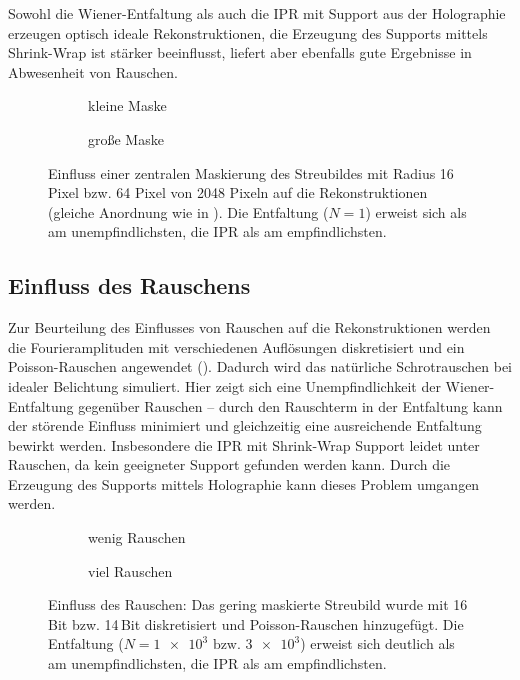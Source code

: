 Sowohl die Wiener-Entfaltung als auch die IPR mit Support aus der Holographie erzeugen optisch ideale Rekonstruktionen, die Erzeugung des Supports mittels Shrink-Wrap ist stärker beeinflusst, liefert aber ebenfalls gute Ergebnisse in Abwesenheit von Rauschen.
\begin{figure}
	\begin{subfigure}[b]{0.48\textwidth}
		\caption{kleine Maske}
	\end{subfigure}
	\hspace*{\fill}
	\begin{subfigure}[b]{0.48\textwidth}
		\caption{große Maske}	
	\end{subfigure}
	\caption[2D Rekonstruktion: Beamstop]{Einfluss einer zentralen Maskierung des Streubildes mit Radius 16 Pixel bzw. 64 Pixel von 2048 Pixeln auf die Rekonstruktionen (gleiche Anordnung wie in ). Die Entfaltung ($N=1$) erweist sich als am unempfindlichsten, die IPR als am empfindlichsten.}
	\label{fig:recon2d-mask}
\end{figure}

\subsection{Einfluss des Rauschens}
Zur Beurteilung des Einflusses von Rauschen auf die Rekonstruktionen werden die Fourieramplituden mit verschiedenen Auflösungen diskretisiert und ein Poisson-Rauschen angewendet (). Dadurch wird das natürliche Schrotrauschen bei idealer Belichtung simuliert. Hier zeigt sich eine Unempfindlichkeit der Wiener-Entfaltung gegenüber Rauschen -- durch den Rauschterm in der Entfaltung kann der störende Einfluss minimiert und gleichzeitig eine ausreichende Entfaltung bewirkt werden. Insbesondere die IPR mit Shrink-Wrap Support leidet unter Rauschen, da kein geeigneter Support gefunden werden kann. Durch die Erzeugung des Supports mittels Holographie kann dieses Problem umgangen werden.
\begin{figure}
	\begin{subfigure}[b]{0.45\textwidth}
		\caption{wenig Rauschen}
	\end{subfigure}
	\hspace*{\fill}
	\begin{subfigure}[b]{0.45\textwidth}
		\caption{viel Rauschen}	
	\end{subfigure}
	\caption[2D Rekonstruktion: Rauschen]{Einfluss des Rauschen: Das gering maskierte Streubild wurde mit 16\,Bit bzw. 14\,Bit diskretisiert und Poisson-Rauschen hinzugefügt. Die Entfaltung ($N=\num{1e3} \text{ bzw. }\num{3e3}$) erweist sich deutlich als am unempfindlichsten, die IPR als am empfindlichsten.}
	\label{fig:recon2d-noise}
\end{figure}

